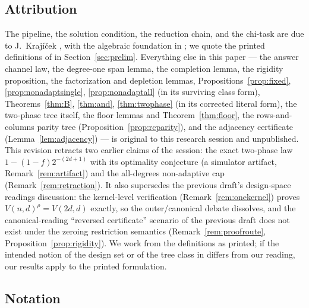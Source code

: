 \documentclass[11pt]{article}
\theoremstyle{definition}
\theoremstyle{remark}
\begin{document}
\subsection{Attribution}

The pipeline, the solution condition, the reduction chain, and the
chi-task are due to J.~Kraj\'i\v{c}ek \cite{Kra26}, with the algebraic
foundation in \cite{BIKPPS97}; we quote the printed definitions of
\cite{Kra26} in Section~\ref{sec:prelim}.  Everything else in this paper
--- the answer channel law, the degree-one span lemma, the completion
lemma, the rigidity proposition, the factorization and depletion lemmas,
Propositions~\ref{prop:fixed}, \ref{prop:nonadaptsingle},
\ref{prop:nonadaptall} (in its surviving class form), Theorems~\ref{thm:B},
\ref{thm:and}, \ref{thm:twophase} (in its corrected literal form), the
two-phase tree itself, the floor lemmas and
Theorem~\ref{thm:floor}, the rows-and-columns parity tree
(Proposition~\ref{prop:rcparity}), and the adjacency certificate
(Lemma~\ref{lem:adjacency}) --- is original to this
research session and unpublished.  This revision retracts two earlier
claims of the session: the exact two-phase law $1-(1-f)2^{-(2d+1)}$
with its optimality conjecture (a simulator artifact,
Remark~\ref{rem:artifact}) and the all-degrees non-adaptive cap
(Remark~\ref{rem:retraction}).  It also supersedes the previous
draft's design-space readings discussion: the kernel-level
verification (Remark~\ref{rem:onekernel}) proves
$V(n,d)^{\rho}=V(2d,d)$ exactly, so the outer/canonical debate
dissolves, and the canonical-reading ``reversed certificate'' scenario
of the previous draft does not exist under the zeroing restriction
semantics (Remark~\ref{rem:proofroute},
Proposition~\ref{prop:rigidity}).  We work from the definitions as
printed; if the intended notion of the design set or of the tree class in
\cite{Kra26} differs from our reading, our results apply to the printed
formulation.

\subsection{Notation}\label{sec:notation}
\end{document}

